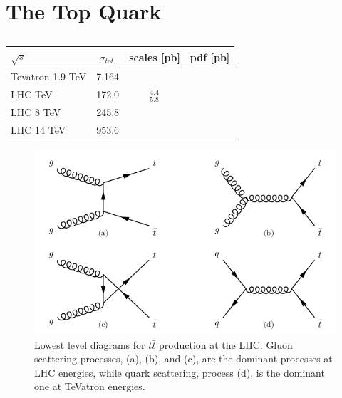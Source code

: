 \section{The Top Quark} \label{sec-TheTopQuark}

\begin{table} \label{tab:mumu_cutflow}
\begin{center}
\begin{tabular}{lccc}
\hline
\hline
\textbf{$\sqrt{s}$} & \textbf{$\sigma_{tot.}$} & \textbf{scales [pb]} & \textbf{pdf [pb]} \\
\hline
Tevatron 1.9 TeV & 7.164 & & \\
LHC TeV & 172.0 & $^4.4_5.8$ &  \\ 
LHC 8 TeV & 245.8 & & \\
LHC 14 TeV & 953.6 & & \\
\hline
\hline
\end{tabular}
\caption{\cite{Czakon:2013goa}}
\end{center}
\end{table}

\begin{figure} \label{fig-ttbarProductionLHC}
\begin{center}
\includegraphics[width=\textwidth]{Figures/ttbarProductionLHC.png}
\caption{Lowest level diagrams for $t\bar{t}$ production at the LHC. Gluon scattering processes, {(a)}, {(b)}, and {(c)}, are the dominant processes at LHC energies, while quark scattering, process {(d)}, is the dominant one at TeVatron energies. \cite{SergeyThesis}}
\end{center}
\end{figure}

